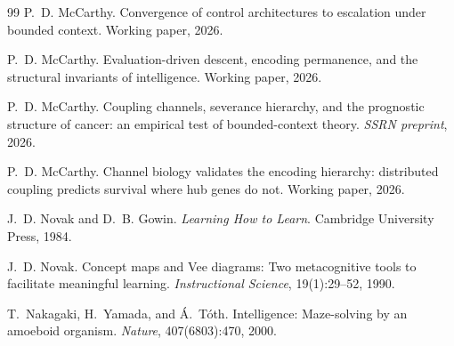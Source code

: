 \documentclass[11pt]{article}
\theoremstyle{definition}
\begin{document}
\begin{thebibliography}{99}
P.~D. McCarthy.
\newblock Convergence of control architectures to escalation under bounded
  context.
\newblock Working paper, 2026.

P.~D. McCarthy.
\newblock Evaluation-driven descent, encoding permanence, and the structural
  invariants of intelligence.
\newblock Working paper, 2026.

P.~D. McCarthy.
\newblock Coupling channels, severance hierarchy, and the prognostic
structure of cancer: an empirical test of bounded-context theory.
\newblock \emph{SSRN preprint}, 2026.

P.~D. McCarthy.
\newblock Channel biology validates the encoding hierarchy: distributed
  coupling predicts survival where hub genes do not.
\newblock Working paper, 2026.

J.~D. Novak and D.~B. Gowin.
\newblock \emph{Learning How to Learn}.
\newblock Cambridge University Press, 1984.

J.~D. Novak.
\newblock Concept maps and {V}ee diagrams: Two metacognitive tools to
  facilitate meaningful learning.
\newblock \emph{Instructional Science}, 19(1):29--52, 1990.

T.~Nakagaki, H.~Yamada, and {\'A}.~T{\'o}th.
\newblock Intelligence: Maze-solving by an amoeboid organism.
\newblock \emph{Nature}, 407(6803):470, 2000.

\end{thebibliography}
\end{document}
